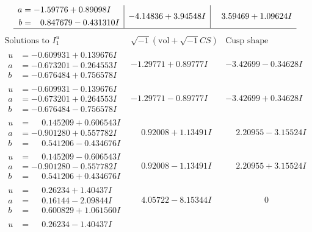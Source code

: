 \documentclass[1p]{elsarticle_modified}
\theoremstyle{definition}
\newcommand{\I}{\sqrt{-1}}
\begin{document}
$$\begin{array}{c|c|c}
\begin{aligned}
a &= -1.59776 + 0.89098 I \\
b &= \phantom{-}0.847679 - 0.431310 I\end{aligned}
 & -4.14836 + 3.94548 I & \phantom{-}3.59469 + 1.09624 I\\
 \hline 
 \end{array}$$\newpage$$\begin{array}{c|c|c}  
\text{Solutions to }I^u_{1}& \I (\text{vol} + \sqrt{-1}CS) & \text{Cusp shape}\\
 \hline 
\begin{aligned}
u &= -0.609931 + 0.139676 I \\
a &= -0.673201 - 0.264553 I \\
b &= -0.676484 + 0.756578 I\end{aligned}
 & -1.29771 + 0.89777 I & -3.42699 - 0.34628 I \\ \hline\begin{aligned}
u &= -0.609931 - 0.139676 I \\
a &= -0.673201 + 0.264553 I \\
b &= -0.676484 - 0.756578 I\end{aligned}
 & -1.29771 - 0.89777 I & -3.42699 + 0.34628 I \\ \hline\begin{aligned}
u &= \phantom{-}0.145209 + 0.606543 I \\
a &= -0.901280 + 0.557782 I \\
b &= \phantom{-}0.541206 - 0.434676 I\end{aligned}
 & \phantom{-}0.92008 + 1.13491 I & \phantom{-}2.20955 - 3.15524 I \\ \hline\begin{aligned}
u &= \phantom{-}0.145209 - 0.606543 I \\
a &= -0.901280 - 0.557782 I \\
b &= \phantom{-}0.541206 + 0.434676 I\end{aligned}
 & \phantom{-}0.92008 - 1.13491 I & \phantom{-}2.20955 + 3.15524 I \\ \hline\begin{aligned}
u &= \phantom{-}0.26234 + 1.40437 I \\
a &= \phantom{-}0.16144 - 2.09844 I \\
b &= \phantom{-}0.600829 + 1.061560 I\end{aligned}
 & \phantom{-}4.05722 - 8.15344 I & \phantom{-0.000000 } 0 \\ \hline\begin{aligned}
u &= \phantom{-}0.26234 - 1.40437 I \\

\end{aligned}
\end{array}$$
\end{document}
